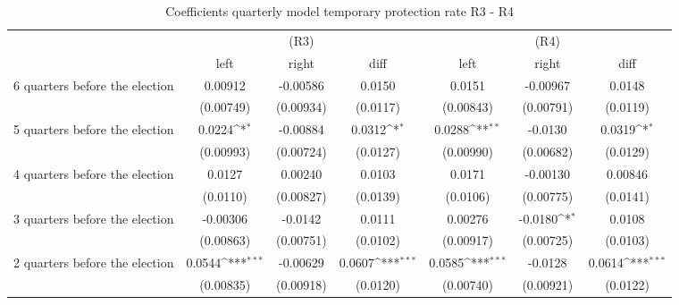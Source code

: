 \begin{table}[!ht]\centering \footnotesize
\def\sym#1{\ifmmode^{#1}\else\(^{#1}\)\fi}
\caption{Coefficients quarterly model temporary protection rate R3 - R4}
\begin{tabular}{l*{6}{c}}
\hline\hline
                    &\multicolumn{3}{c}{(R3)}&\multicolumn{3}{c}{(R4)}\\
&\multicolumn{1}{c}{left}&\multicolumn{1}{c}{right}&\multicolumn{1}{c}{diff}&\multicolumn{1}{c}{left}&\multicolumn{1}{c}{right}&\multicolumn{1}{c}{diff}\\
\hline
 6 quarters before the election&     0.00912         &    -0.00586         &      0.0150         &      0.0151         &    -0.00967         &      0.0148         \\
                    &   (0.00749)         &   (0.00934)         &    (0.0117)         &   (0.00843)         &   (0.00791)         &    (0.0119)         \\
[0,5em]
 5 quarters before the election&      0.0224\sym{*}  &    -0.00884         &      0.0312\sym{*}  &      0.0288\sym{**} &     -0.0130         &      0.0319\sym{*}  \\
                    &   (0.00993)         &   (0.00724)         &    (0.0127)         &   (0.00990)         &   (0.00682)         &    (0.0129)         \\
[0,5em]
 4 quarters before the election&      0.0127         &     0.00240         &      0.0103         &      0.0171         &    -0.00130         &     0.00846         \\
                    &    (0.0110)         &   (0.00827)         &    (0.0139)         &    (0.0106)         &   (0.00775)         &    (0.0141)         \\
[0,5em]
 3 quarters before the election&    -0.00306         &     -0.0142         &      0.0111         &     0.00276         &     -0.0180\sym{*}  &      0.0108         \\
                    &   (0.00863)         &   (0.00751)         &    (0.0102)         &   (0.00917)         &   (0.00725)         &    (0.0103)         \\
[0,5em]
 2 quarters before the election&      0.0544\sym{***}&    -0.00629         &      0.0607\sym{***}&      0.0585\sym{***}&     -0.0128         &      0.0614\sym{***}\\
                    &   (0.00835)         &   (0.00918)         &    (0.0120)         &   (0.00740)         &   (0.00921)         &    (0.0122)         \\

\end{tabular}
\end{table}
